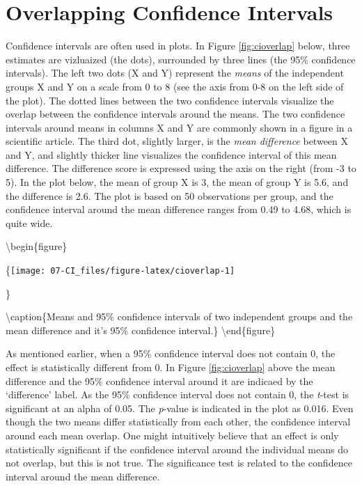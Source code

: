 \documentclass[
  oneside]{book}
\begin{document}
\hypertarget{overlapping-confidence-intervals}{%
\section{Overlapping Confidence Intervals}\label{overlapping-confidence-intervals}}

Confidence intervals are often used in plots. In Figure \ref{fig:cioverlap} below, three estimates are vizluaized (the dots), surrounded by three lines (the 95\% confidence intervals). The left two dots (X and Y) represent the \emph{means} of the independent groups X and Y on a scale from 0 to 8 (see the axis from 0-8 on the left side of the plot). The dotted lines between the two confidence intervals visualize the overlap between the confidence intervals around the means. The two confidence intervals around means in columns X and Y are commonly shown in a figure in a scientific article. The third dot, slightly larger, is the \emph{mean difference} between X and Y, and slightly thicker line visualizes the confidence interval of this mean difference. The difference score is expressed using the axis on the right (from -3 to 5). In the plot below, the mean of group X is 3, the mean of group Y is 5.6, and the difference is 2.6. The plot is based on 50 observations per group, and the confidence interval around the mean difference ranges from 0.49 to 4.68, which is quite wide.

\textbackslash begin\{figure\}

\{\centering \texttt{[image: 07-CI\_files/figure-latex/cioverlap-1]}

\}

\textbackslash caption\{Means and 95\% confidence intervals of two independent groups and the mean difference and it's 95\% confidence interval.\}\label{fig:cioverlap}
\textbackslash end\{figure\}

As mentioned earlier, when a 95\% confidence interval does not contain 0, the effect is statistically different from 0. In Figure \ref{fig:cioverlap} above the mean difference and the 95\% confidence interval around it are indicaed by the `difference' label. As the 95\% confidence interval does not contain 0, the \emph{t}-test is significant at an alpha of 0.05. The \emph{p}-value is indicated in the plot as 0.016. Even though the two means differ statistically from each other, the confidence interval around each mean overlap. One might intuitively believe that an effect is only statistically significant if the confidence interval around the individual means do not overlap, but this is not true. The significance test is related to the confidence interval around the mean difference.
\end{document}
